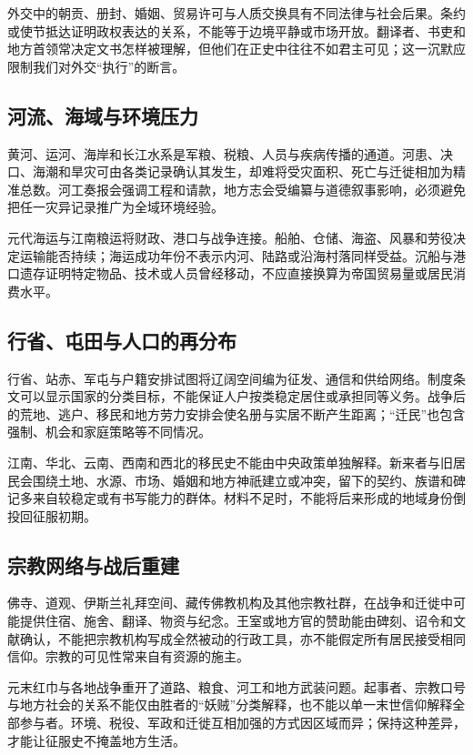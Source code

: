 外交中的朝贡、册封、婚姻、贸易许可与人质交换具有不同法律与社会后果。条约或使节抵达证明政权表达的关系，不能等于边境平静或市场开放。翻译者、书吏和地方首领常决定文书怎样被理解，但他们在正史中往往不如君主可见；这一沉默应限制我们对外交“执行”的断言。

\subsection{河流、海域与环境压力}

黄河、运河、海岸和长江水系是军粮、税粮、人员与疾病传播的通道。河患、决口、海潮和旱灾可由各类记录确认其发生，却难将受灾面积、死亡与迁徙相加为精准总数。河工奏报会强调工程和请款，地方志会受编纂与道德叙事影响，必须避免把任一灾异记录推广为全域环境经验。

元代海运与江南粮运将财政、港口与战争连接。船舶、仓储、海盗、风暴和劳役决定运输能否持续；海运成功年份不表示内河、陆路或沿海村落同样受益。沉船与港口遗存证明特定物品、技术或人员曾经移动，不应直接换算为帝国贸易量或居民消费水平。

\subsection{行省、屯田与人口的再分布}

行省、站赤、军屯与户籍安排试图将辽阔空间编为征发、通信和供给网络。制度条文可以显示国家的分类目标，不能保证人户按类稳定居住或承担同等义务。战争后的荒地、逃户、移民和地方劳力安排会使名册与实居不断产生距离；“迁民”也包含强制、机会和家庭策略等不同情况。

江南、华北、云南、西南和西北的移民史不能由中央政策单独解释。新来者与旧居民会围绕土地、水源、市场、婚姻和地方神祇建立或冲突，留下的契约、族谱和碑记多来自较稳定或有书写能力的群体。材料不足时，不能将后来形成的地域身份倒投回征服初期。

\subsection{宗教网络与战后重建}

佛寺、道观、伊斯兰礼拜空间、藏传佛教机构及其他宗教社群，在战争和迁徙中可能提供住宿、施舍、翻译、物资与纪念。王室或地方官的赞助能由碑刻、诏令和文献确认，不能把宗教机构写成全然被动的行政工具，亦不能假定所有居民接受相同信仰。宗教的可见性常来自有资源的施主。

元末红巾与各地战争重开了道路、粮食、河工和地方武装问题。起事者、宗教口号与地方社会的关系不能仅由胜者的“妖贼”分类解释，也不能以单一末世信仰解释全部参与者。环境、税役、军政和迁徙互相加强的方式因区域而异；保持这种差异，才能让征服史不掩盖地方生活。
